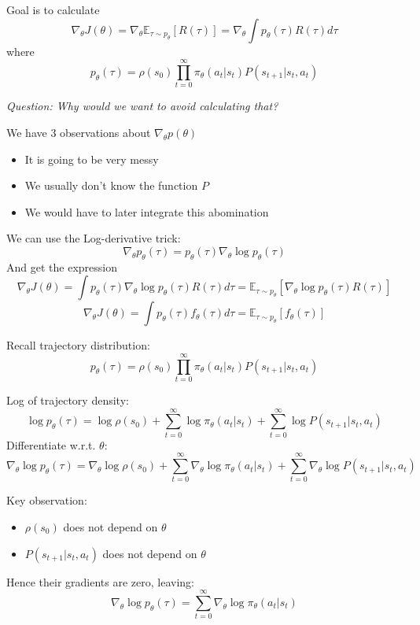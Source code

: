 \documentclass[10pt]{beamer}
\begin{document}
\begin{frame}    
    Goal is to calculate
    \[
    \nabla_\theta J(\theta) = \nabla_\theta \mathbb{E}_{\tau \sim p_{\theta}}[R(\tau)] = \nabla_\theta \int p_\theta (\tau) R(\tau)  d\tau
    \]
    where
    \[
    p_\theta (\tau) = \rho (s_0) \prod_{t=0}^\infty \pi_\theta (a_t | s_t) P(s_{t+1} | s_t, a_t)
    \]
    \begin{center}
    \textit{Question: Why would we want to avoid calculating that?}
    \end{center}
    \bigskip
    \pause
    We have 3 observations about $\nabla_\theta p(\theta)$
    \pause
    \begin{itemize}
        \item It is going to be very messy
        \pause
        \item We usually don't know the function $P$
        \pause
        \item We would have to later integrate this abomination
    \end{itemize}

\end{frame}

\begin{frame}
    We can use the Log-derivative trick:
    \[
    \nabla_\theta p_\theta (\tau) = p_\theta (\tau) \nabla_\theta \log p_\theta (\tau)
    \]
    \pause    
    And get the expression 
    \[
    \nabla_\theta J(\theta) = \int p_\theta (\tau) \nabla_\theta \log p_\theta (\tau) R(\tau)  d\tau = \mathbb{E}_{\tau \sim p_\theta} [\nabla_\theta \log p_\theta (\tau) R(\tau)]
    \]
    \[
    \nabla_\theta J(\theta) = \int p_\theta (\tau) f_\theta(\tau) d\tau = \mathbb{E}_{\tau \sim p_\theta} [f_\theta(\tau)]
    \]
    
\end{frame}

\begin{frame}

    Recall trajectory distribution:
    \[
    p_\theta(\tau) = \rho(s_0) \prod_{t=0}^\infty \pi_\theta(a_t | s_t) P(s_{t+1} | s_t, a_t)
    \]

    Log of trajectory density:
    \[
    \log p_\theta(\tau) = \log \rho(s_0) + \sum_{t=0}^\infty \log \pi_\theta(a_t | s_t) + \sum_{t=0}^\infty \log P(s_{t+1} | s_t, a_t)
    \]
\pause
    Differentiate w.r.t. \(\theta\):
    \[
    \nabla_\theta \log p_\theta(\tau) = \nabla_\theta \log \rho(s_0) + \sum_{t=0}^\infty \nabla_\theta \log \pi_\theta(a_t | s_t) + \sum_{t=0}^\infty \nabla_\theta \log P(s_{t+1} | s_t, a_t)
    \]

    Key observation:
    \begin{itemize}
        \item \(\rho(s_0)\) does not depend on \(\theta\)
        \item \(P(s_{t+1} | s_t, a_t)\) does not depend on \(\theta\)
    \end{itemize}
\pause
    Hence their gradients are zero, leaving:
    \[
    \nabla_\theta \log p_\theta(\tau) = \sum_{t=0}^\infty \nabla_\theta \log \pi_\theta(a_t | s_t)
    \]
\end{frame}
\end{document}
